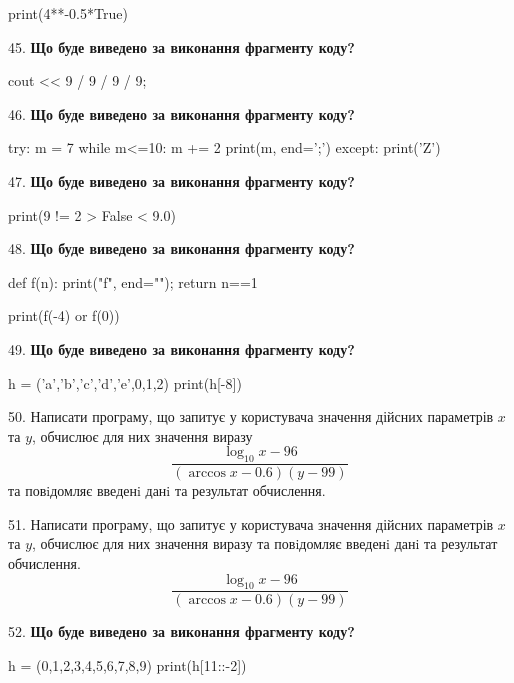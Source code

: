 \documentclass[11pt]{article}
\begin{document}
print(4**-0.5*True)
\par\vspace{5mm}
45. \textbf{Що буде виведено за виконання фрагменту коду?}

cout << 9 / 9 / 9 / 9;
\par\vspace{5mm}
46. \textbf{Що буде виведено за виконання фрагменту коду?}

try:
    m = 7
    while m<=10:
        m += 2
    print(m, end=';')
except:
    print('Z')

\par\vspace{5mm}
47. \textbf{Що буде виведено за виконання фрагменту коду?}

print(9 != 2 > False < 9.0)
\par\vspace{5mm}
48. \textbf{Що буде виведено за виконання фрагменту коду?}

def f(n):
    print("f", end="");
    return n==1

print(f(-4) or f(0))
\par\vspace{5mm}
49. \textbf{Що буде виведено за виконання фрагменту коду?}

h = ('a','b','c','d','e',0,1,2)
print(h[-8])

\par\vspace{5mm}
50. 
Написати програму, що запитує у користувача значення дійсних параметрів $x$ та $y$, обчислює для них значення виразу 
$$\frac{\log_{10} x - 96}{(\arccos x - 0.6) (y - 99)}$$ 
та повiдомляє введенi данi та результат обчислення.

\par\vspace{5mm}
51. 
Написати програму, що запитує у користувача значення дійсних параметрів $x$ та $y$, обчислює для них значення виразу та повiдомляє введенi данi та результат обчислення.
$$\frac{\log_{10} x - 96}{(\arccos x - 0.6) (y - 99)}$$ 

\par\vspace{5mm}
52. \textbf{Що буде виведено за виконання фрагменту коду?}

h = (0,1,2,3,4,5,6,7,8,9)
print(h[11::-2])
\end{document}
